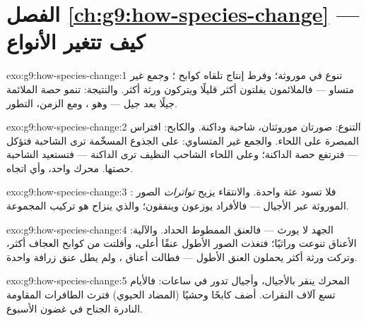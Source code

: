 \section*{الفصل \ref{ch:g9:how-species-change} --- كيف تتغير الأنواع}

\begin{solution}{exo:g9:how-species-change:1}
تنوع في  موروثة؛ وفرط إنتاج تلقاه كوابح ؛ وجمع
غير متساو --- فالملائمون يفلتون أكثر قليلًا ويتركون ورثة
أكثر. والنتيجة: تنمو حصة  الملائمة جيلًا بعد جيل
--- وهو ، ومع الزمن، التطور.
\end{solution}

\begin{solution}{exo:g9:how-species-change:2}
التنوع: صورتان موروثتان، شاحبة وداكنة. والكابح: افتراس
 المبصرة على اللحاء. والجمع غير المتساوي: على
الجذوع المسخّمة ترى الشاحبة فتؤكل --- فترتفع حصة
الداكنة؛ وعلى اللحاء الشاحب النظيف ترى الداكنة ---
فتستعيد الشاحبة حصتها. محرك واحد، وأي اتجاه.
\end{solution}

\begin{solution}{exo:g9:how-species-change:3}
: فلا تسود عثة واحدة. والانتقاء يزيح
\emph{تواترات} الصور الموروثة عبر الأجيال --- فالأفراد
يوزعون وينفقون؛ والذي ينزاح هو تركيب المجموعة.
\end{solution}

\begin{solution}{exo:g9:how-species-change:4}
الجهد لا يورث --- فالعنق الممطوط  الحداد. والآلية:
الأعناق تنوعت وراثيًا؛ فتغذت الصور الأطول عنقًا أعلى،
وأفلتت من كوابح العجاف أكثر، وتركت ورثة أكثر يحملون
 العنق الأطول --- فطالت أعناق ، ولم يطل عنق
زرافة واحدة.
\end{solution}

\begin{solution}{exo:g9:how-species-change:5}
المحرك ينقر بالأجيال، وأجيال  تدور في ساعات:
فالأيام تسع آلاف النقرات. أضف كابحًا وحشيًا (المضاد
الحيوي) فترث الطافرات المقاومة النادرة الجناح في غضون
الأسبوع.
\end{solution}

